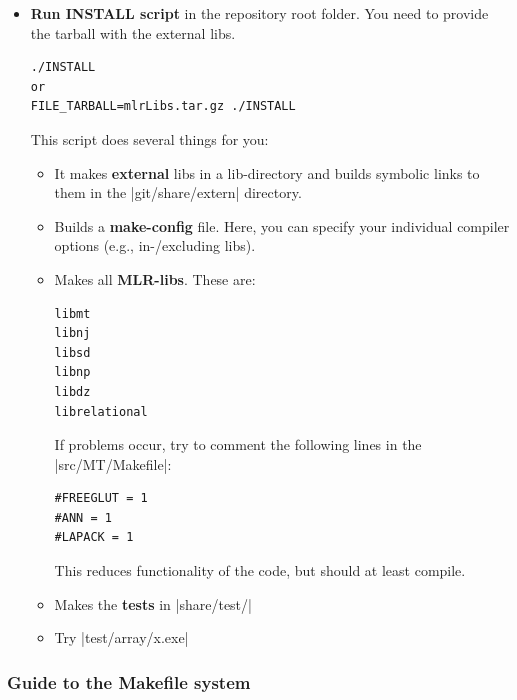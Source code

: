 \begin{itemize}
\item \textbf{Run INSTALL script} in the repository root folder. You
need to provide the tarball with the external libs.
\begin{code}
\begin{verbatim}
./INSTALL
or
FILE_TARBALL=mlrLibs.tar.gz ./INSTALL
\end{verbatim}
\end{code}
This script does several things for you:

\begin{itemize}

\item It makes \textbf{external} libs in a lib-directory and builds
symbolic links to them in the |git/share/extern| directory.


\item Builds a \textbf{make-config} file. Here, you can specify your
individual compiler options (e.g., in-/excluding libs).


\item Makes all \textbf{MLR-libs}. These are:
\begin{code}
\begin{verbatim}
libmt
libnj
libsd
libnp
libdz
librelational
\end{verbatim}
\end{code}

If problems occur, try to comment the following lines in the
|src/MT/Makefile|:
\begin{code}
\begin{verbatim}
#FREEGLUT = 1
#ANN = 1
#LAPACK = 1
\end{verbatim}
\end{code}
This reduces functionality of the code, but should at least compile.



\item Makes the \textbf{tests} in |share/test/|


\item Try |test/array/x.exe|

\end{itemize}

\end{itemize}



\subsubsection{Guide to the Makefile system}

